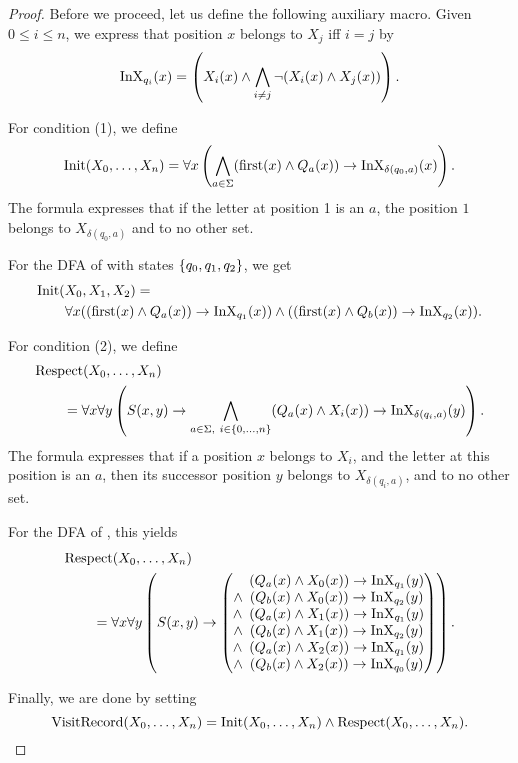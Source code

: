 \documentclass[11pt,twoside=off,numbers=noenddot]{scrbook}
\begin{document}
\begin{proof}
  Before we proceed, let us define the following auxiliary macro. Given $0 \leq i \leq n$, we express that position $x$ belongs to $X_j$ iff $i = j$ by
  \[ \text{InX}_{q_i}(x) = \left( X_i(x) \wedge \bigwedge_{i \neq j} \neg (X_i(x) \wedge X_j(x)) \right). \]

  For condition (1), we define
  \[ \text{Init}(X_0, \dots, X_n) = \forall x \left( \bigwedge_{a \in \Sigma} (\text{first}(x) \wedge Q_a(x)) \rightarrow \text{InX}_{\delta(q_0, a)}(x) \right). \]
  The formula expresses that if the letter at position 1 is an $a$, the position $1$ belongs to $X_{\delta(q_0, a)}$ and to no other set.

  \begin{example}
    For the DFA of  with states $\{ q_0, q_1, q_2 \}$, we get
    \begin{align*}
      & \text{Init}(X_0, X_1, X_2) = \\
      & \qquad \forall x ((\text{first}(x) \wedge Q_a(x)) \rightarrow \text{InX}_{q_1}(x)) \wedge ((\text{first}(x) \wedge Q_b(x)) \rightarrow \text{InX}_{q_2}(x)).
    \end{align*}
  \end{example}

  For condition (2), we define
  \begin{align*}
    & \text{Respect}(X_0, \dots, X_n) \\
    & \qquad = \forall x \forall y \left( S(x, y) \rightarrow \bigwedge_{a \in \Sigma, \ i \in \{ 0, \dots, n \}} (Q_a(x) \wedge X_i(x)) \rightarrow \text{InX}_{\delta(q_i, a)}(y) \right).
  \end{align*}
  The formula expresses that if a position $x$ belongs to $X_i$, and the letter at this position is an $a$, then its successor position $y$ belongs to $X_{\delta(q_i, a)}$, and to no other set.

  \begin{example}
    For the DFA of , this yields
    \begin{align*}
      & \text{Respect}(X_0, \dots, X_n) \\
      & \qquad = \forall x \forall y \left( S(x, y) \rightarrow
        \begin{pmatrix}
          \phantom{\wedge} \enskip (Q_a(x) \wedge X_0(x)) \rightarrow \text{InX}_{q_1}(y) \\
          \wedge \enskip (Q_b(x) \wedge X_0(x)) \rightarrow \text{InX}_{q_2}(y) \\
          \wedge \enskip (Q_a(x) \wedge X_1(x)) \rightarrow \text{InX}_{q_1}(y) \\
          \wedge \enskip (Q_b(x) \wedge X_1(x)) \rightarrow \text{InX}_{q_2}(y) \\
          \wedge \enskip (Q_a(x) \wedge X_2(x)) \rightarrow \text{InX}_{q_1}(y) \\
          \wedge \enskip (Q_b(x) \wedge X_2(x)) \rightarrow \text{InX}_{q_0}(y)
      \end{pmatrix} \right).
    \end{align*}
  \end{example}

  Finally, we are done by setting
  \[ \text{VisitRecord}(X_0, \dots, X_n) = \text{Init}(X_0, \dots, X_n) \wedge \text{Respect}(X_0, \dots, X_n). \]
\end{proof}
\end{document}
